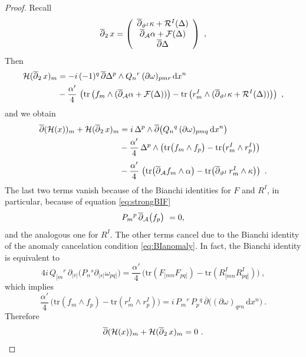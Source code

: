 \documentclass[12pt,a4paper]{article}
\def\bar#1{\overline{#1}}
\let\p=\partial
\def\d{\textrm{d}}
\def\bp{\bar{\partial}}
\def\tr{\textrm{tr}}
\theoremstyle{definition}
\begin{document}
\begin{proof}
Recall
\begin{equation*}
\bp_2\, x = \left(
\begin{array}{c}
\bp_{\vartheta^I}\kappa + {\cal R}^I(\Delta)\\
\bp_{\cal A}\alpha + {\cal F}(\Delta)\\
\bp\Delta
\end{array}\right)~,
\end{equation*}
Then
\begin{equation}
\begin{split}
{\cal H}(\bp_2\, x)_m &= - i\, (-1)^q\, \bp\Delta^p\wedge Q_n{}^r\, (\p\omega)_{pmr}\,\d x^n\\
&  - \frac{\alpha'}{4}\, \left(
  {\rm tr}\left(f_m\wedge(\bp_{\cal A}\alpha + {\cal F}(\Delta))\right)
- {\rm tr}\left(r_m^I\wedge(\bp_{\vartheta^I}\kappa + {\cal R}^I(\Delta))\right)
\right)~,\label{eq:Hd2x}
\end{split}
\end{equation}
and we obtain
\begin{equation}
\begin{split} 
\bp({\cal H}(x))_m + {\cal H}(\bp_2\, x)_m &=
 i\, \Delta^p\wedge\bp\big( Q_n{}^q\, (\p\omega)_{pmq}\,\d x^n\big)\\
& - \frac{\alpha'}{4}\, \Delta^p\wedge \left(
   {\rm tr}\big(f_m\wedge f_p\big) 
   - {\rm tr}\big(r^I_m\wedge r^I_p\big)
\right) \\[3pt]
&  - \frac{\alpha'}{4}\,\left(
{\rm tr}\big( \bp_{\cal A}f_m\wedge\alpha\big) 
-{\rm tr}\big( \bp_{\vartheta^I}\,r^I_m\wedge\kappa\big) 
  \right)~. \label{eq:theo}
\end{split}
\end{equation}
The last two terms vanish because of the Bianchi identities for $F$ and $R^I$, in particular, because of equation  \eqref{eq:strongBIF}
\begin{equation*}
P_{m}{}^p\,\bp_{\cal A} \big(f_p\big)~ = 0,  
\end{equation*}
and the analogous one for $R^I$. The other terms cancel due to the Bianchi identity of the anomaly cancelation condition \eqref{eq:BIanomaly}.
In fact, the Bianchi identity is equivalent to
\[ 4 i \, Q_{[m}{}^r\, \partial_{|r|}\big(P_n{}^s\p_{|s|}\omega_{pq]}\big)
= \frac{\alpha'}{4}\, \big( \tr(F_{[mn}F_{pq]}) - \tr(R^I_{[mn}R^I_{pq]}) \big)~,\]
which implies
\[ \frac{\alpha'}{4}\, \big( \tr(f_m\wedge f_p) - \tr (r^I_m\wedge r^I_p)\big)
=
i\, P_m{}^r \, P_p{}^q\, \bp\big( (\p\omega)_{qrn}\, \d x^n\big)~.\]
Therefore
\[ \bp({\cal H}(x))_m + {\cal H}(\bp_2\, x)_m = 0~.\]
\end{proof}
\end{document}

